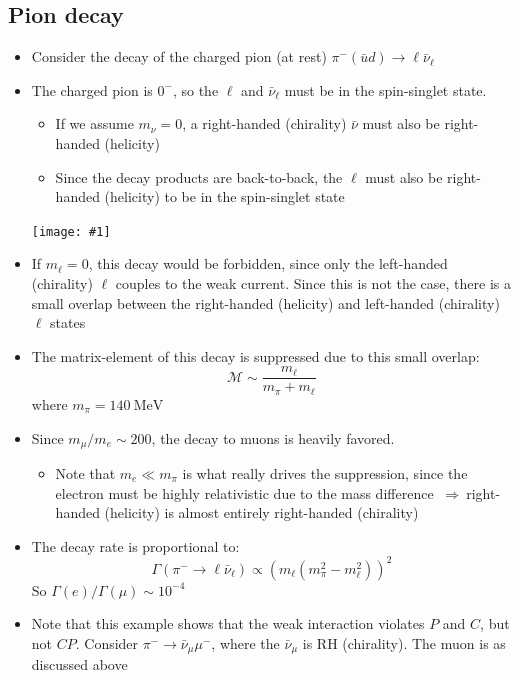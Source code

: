 \documentclass[11pt]{article}
\newcommand{\ubar}{\bar{u}}
\newcommand{\nubar}{{\bar{\nu}}}
\newcommand{\Mme}{\mathcal{M}}
\newcommand{\mev}{\text{MeV}}
\newcommand{\thus}{\ensuremath{~\Rightarrow~}}
\newcommand{\embedimgw}[2]{\begin{center}\texttt{[image: \#1]}\end{center}}
\begin{document}
\subsection{Pion decay}
\begin{itemize}
  \item Consider the decay of the charged pion (at rest) $\pi^-(\ubar d)\rightarrow \ell \nubar_\ell$
  \item The charged pion is $0^-$, so the $\ell$ and $\nubar_\ell$ must be in the spin-singlet state. 
  \begin{itemize}
    \item If we assume $m_\nu = 0$, a right-handed (chirality) $\nubar$ must also be right-handed (helicity)
    \item Since the decay products are back-to-back, the $\ell$ must also be right-handed (helicity) to be in the spin-singlet state
  \end{itemize}
  \embedimgw{figs/piondecay.png}{.6}
  \item If $m_\ell = 0$, this decay would be forbidden, since only the left-handed (chirality) $\ell$ couples to the weak current. Since this is not the case, there is a small overlap between the right-handed (helicity) and left-handed (chirality) $\ell$ states
  \item The matrix-element of this decay is suppressed due to this small overlap:
  \begin{equation}
    \Mme \sim \frac{m_\ell}{m_\pi + m_\ell}
  \end{equation}
  where $m_\pi = 140~\mev$
  \item Since $m_\mu/m_e \sim 200$, the decay to muons is heavily favored.
  \begin{itemize}
    \item Note that $m_e \ll m_\pi$ is what really drives the suppression, since the electron must be highly relativistic due to the mass difference \thus right-handed (helicity) is almost entirely right-handed (chirality)
  \end{itemize}
  \item The decay rate is proportional to:
  \begin{equation}
    \Gamma (\pi^- \rightarrow \ell \nubar_\ell) \propto \left(m_\ell \left(m_\pi^2 - m_\ell^2\right) \right)^2
  \end{equation}
  So $\Gamma(e)/\Gamma(\mu) \sim 10^{-4}$
  \item Note that this example shows that the weak interaction violates $P$ and $C$, but not $CP$. Consider $\pi^-\rightarrow \nubar_\mu \mu^-$, where the $\nubar_\mu$ is RH (chirality). The muon is as discussed above

\end{itemize}
\end{document}
